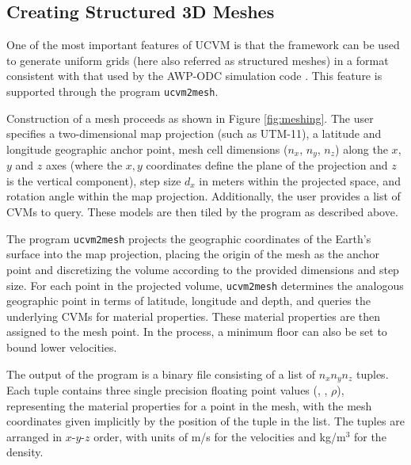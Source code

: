 


\subsection{Creating Structured 3D Meshes}

One of the most important features of UCVM is that the framework can be used to generate uniform grids (here also referred as structured meshes) in a format consistent with that used by the AWP-ODC simulation code \citep{Cui_2010_Proc}. This feature is supported through the program \texttt{ucvm2mesh}.

Construction of a mesh proceeds as shown in Figure \ref{fig:meshing}. The user specifies a two-dimensional map projection (such as UTM-11), a latitude and longitude geographic anchor point, mesh cell dimensions ($n_x$, $n_y$, $n_z$) along the $x$, $y$ and $z$ axes (where the $x,y$ coordinates define the plane of the projection and $z$ is the vertical component), step size $d_x$ in meters within the projected space, and rotation angle within the map projection. Additionally, the user provides a list of CVMs to query. These models are then tiled by the program as described above.

The program \texttt{ucvm2mesh} projects the geographic coordinates of the Earth's surface into the map projection, placing the origin of the mesh as the anchor point and discretizing the volume according to the provided dimensions and step size. For each point in the projected volume, \texttt{ucvm2mesh} determines the analogous geographic point in terms of latitude, longitude and depth, and queries the underlying CVMs for material properties. These material properties are then assigned to the mesh point. In the process, a minimum \vs{} floor can also be set to bound lower velocities.

The output of the program is a binary file consisting of a list of $n_xn_yn_z$ tuples. Each tuple contains three single precision floating point values (\vp{}, \vs{}, $\rho$), representing the material properties for a point in the mesh, with the mesh coordinates given implicitly by the position of the tuple in the list. The tuples are arranged in $x$-$y$-$z$ order, with units of m/s for the velocities and kg/m$^3$ for the density.

